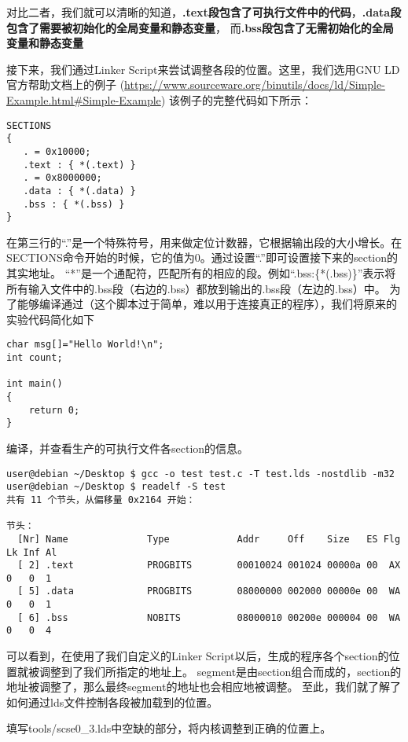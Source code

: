 对比二者，我们就可以清晰的知道，\textbf{.text段包含了可执行文件中的代码}，\textbf{.data段包含了需要被初始化的全局变量和静态变量}，
而\textbf{.bss段包含了无需初始化的全局变量和静态变量}

接下来，我们通过Linker Script来尝试调整各段的位置。这里，我们选用GNU LD官方帮助文档上的例子
(\url{https://www.sourceware.org/binutils/docs/ld/Simple-Example.html#Simple-Example})
该例子的完整代码如下所示：

\begin{verbatim}
SECTIONS
{
   . = 0x10000;
   .text : { *(.text) }
   . = 0x8000000;
   .data : { *(.data) }
   .bss : { *(.bss) }
}
\end{verbatim}

在第三行的“.”是一个特殊符号，用来做定位计数器，它根据输出段的大小增长。在SECTIONS命令开始的时候，它的值为0。通过设置“.”即可设置接下来的section的其实地址。
“*”是一个通配符，匹配所有的相应的段。例如“.bss:\{*(.bss)\}”表示将所有输入文件中的.bss段（右边的.bss）都放到输出的.bss段（左边的.bss）中。
为了能够编译通过（这个脚本过于简单，难以用于连接真正的程序），我们将原来的实验代码简化如下

\begin{verbatim}
char msg[]="Hello World!\n";
int count;

int main()
{
    return 0;
}
\end{verbatim}

编译，并查看生产的可执行文件各section的信息。

\begin{verbatim}
user@debian ~/Desktop $ gcc -o test test.c -T test.lds -nostdlib -m32
user@debian ~/Desktop $ readelf -S test                              
共有 11 个节头，从偏移量 0x2164 开始：

节头：
  [Nr] Name              Type            Addr     Off    Size   ES Flg Lk Inf Al
  [ 2] .text             PROGBITS        00010024 001024 00000a 00  AX  0   0  1
  [ 5] .data             PROGBITS        08000000 002000 00000e 00  WA  0   0  1
  [ 6] .bss              NOBITS          08000010 00200e 000004 00  WA  0   0  4
\end{verbatim}

可以看到，在使用了我们自定义的Linker Script以后，生成的程序各个section的位置就被调整到了我们所指定的地址上。
segment是由section组合而成的，section的地址被调整了，那么最终segment的地址也会相应地被调整。
至此，我们就了解了如何通过lds文件控制各段被加载到的位置。

\begin{exercise}
填写tools/scse0\_3.lds中空缺的部分，将内核调整到正确的位置上。
\end{exercise}

